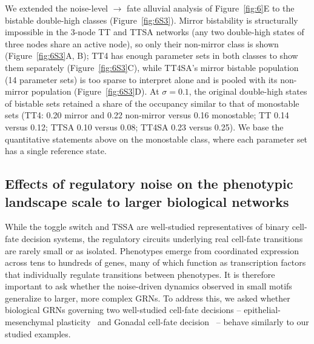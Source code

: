 \documentclass[11pt]{article}
\begin{document}
We extended the noise-level $\to$ fate alluvial analysis of Figure~\ref{fig:6}E to the bistable double-high classes (Figure~\ref{fig:6S3}). Mirror bistability is structurally impossible in the 3-node TT and TTSA networks (any two double-high states of three nodes share an active node), so only their non-mirror class is shown (Figure~\ref{fig:6S3}A, B); TT4 has enough parameter sets in both classes to show them separately (Figure~\ref{fig:6S3}C), while TT4SA's mirror bistable population (14 parameter sets) is too sparse to interpret alone and is pooled with its non-mirror population (Figure~\ref{fig:6S3}D). At $\sigma = 0.1$, the original double-high states of bistable sets retained a share of the occupancy similar to that of monostable sets (TT4: 0.20 mirror and 0.22 non-mirror versus 0.16 monostable; TT 0.14 versus 0.12; TTSA 0.10 versus 0.08; TT4SA 0.23 versus 0.25). We base the quantitative statements above on the monostable class, where each parameter set has a single reference state.

\subsection{Effects of regulatory noise on the phenotypic landscape scale to larger biological networks}

While the toggle switch and TSSA are well-studied representatives of binary cell-fate decision systems, the regulatory circuits underlying real cell-fate transitions are rarely small or as isolated. Phenotypes emerge from coordinated expression across tens to hundreds of genes, many of which function as transcription factors that individually regulate transitions between phenotypes. It is therefore important to ask whether the noise-driven dynamics observed in small motifs generalize to larger, more complex GRNs. To address this, we asked whether biological GRNs governing two well-studied cell-fate decisions -- epithelial-mesenchymal plasticity~\cite{hari2022landscape} and Gonadal cell-fate decision~\cite{rios2015boolean} -- behave similarly to our studied examples.
\end{document}
